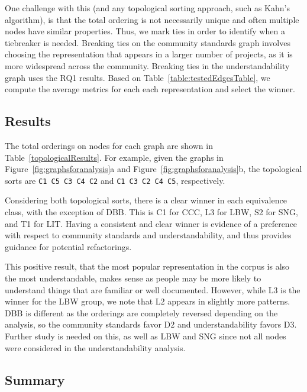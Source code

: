 One challenge with this (and any topological sorting approach, such as Kahn's algorithm), is that the total ordering is not necessarily unique and often multiple nodes have similar properties. 
Thus, we mark ties in order to identify when a tiebreaker is needed.
Breaking ties on the community standards graph involves choosing the representation that appears in a larger number of projects, as it is more widespread across the community. 
Breaking ties in the understandability graph uses the RQ1 results. Based on Table~\ref{table:testedEdgesTable}, we compute the average metrics for each each representation and select the winner. 

\subsection{Results}
The total orderings on nodes for each graph are shown in Table~\ref{topologicalResults}.  For example, given the graphs in Figure~\ref{fig:graphsforanalysis}a and Figure~\ref{fig:graphsforanalysis}b, the topological sorts are {\tt C1 C5 C3 C4 C2} and  {\tt C1 C3 C2 C4 C5}, respectively.



Considering both topological sorts, there is a clear winner in each equivalence class, with the exception of DBB.
This is C1 for CCC, L3 for LBW, S2 for SNG, and T1 for LIT.
Having a consistent and clear winner is evidence of a preference with respect to community standards and understandability, and thus provides guidance for potential refactorings.

This positive result, that the most popular representation in the corpus is also the most understandable, makes sense as people may be more likely to understand things that are familiar or well documented. However, while L3 is the winner for the LBW group, we note that L2 appears in slightly more patterns.
DBB is different  as the orderings are completely reversed depending on the analysis, so the community standards favor D2 and understandability favors D3. Further study is needed on this, as well as  LBW and SNG since not all nodes were considered in the understandability analysis. 
%

\subsection{Summary}
